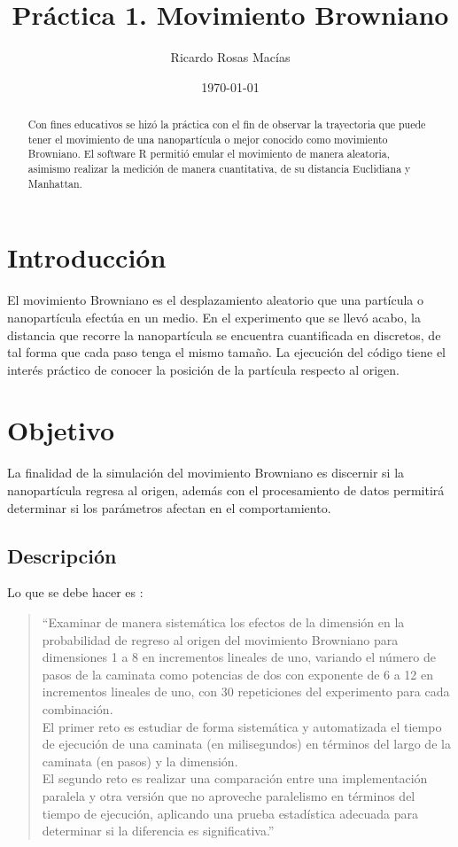 \documentclass[12pt, letterpaper] {article}
\author{Ricardo Rosas Macías}
\title{Práctica 1. Movimiento Browniano}
\date{\today}
\begin{document}
\maketitle


\begin{abstract}
Con fines educativos se hizó la práctica con el fin de observar la trayectoria que puede tener el movimiento de una nanopartícula o mejor conocido como movimiento Browniano. El software R permitió emular el movimiento de manera aleatoria, asimismo realizar la medición de manera cuantitativa, de su distancia Euclidiana y Manhattan.\\[5mm]
\end{abstract}

\section{Introducción}

El movimiento Browniano es el desplazamiento aleatorio que una partícula o nanopartícula efectúa en un medio. En el experimento que se llevó acabo, la distancia que recorre la nanopartícula se encuentra cuantificada en discretos, de tal forma que cada paso tenga el mismo tamaño. La ejecución del código tiene el interés práctico de conocer la posición de la partícula respecto al origen. 

 \section{Objetivo}
La finalidad de la simulación del movimiento Browniano es discernir si la nanopartícula regresa al origen, además con el procesamiento de datos permitirá determinar si los parámetros afectan en el comportamiento.
 
  \subsection{Descripción}

Lo que se debe hacer es \cite{elisawebMB}:
\begin{quotation}
 ``Examinar de manera sistemática los efectos de la dimensión en la probabilidad de regreso al origen del movimiento Browniano para dimensiones 1 a 8 en incrementos lineales de uno, variando el número de pasos de la caminata como potencias de dos con exponente de 6 a 12 en incrementos lineales de uno, con 30 repeticiones del experimento para cada combinación.\\
 
 El primer reto es estudiar de forma sistemática y automatizada el tiempo de ejecución de una caminata (en milisegundos) en términos del largo de la caminata (en pasos) y la dimensión.\\

El segundo reto es realizar una comparación entre una implementación paralela y otra versión que no aproveche paralelismo en términos del tiempo de ejecución, aplicando una prueba estadística adecuada para determinar si la diferencia es significativa.''
\end{quotation}
\end{document}

